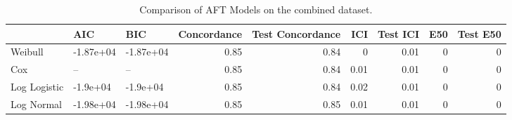 \begin{table*}
\centering
\caption{Comparison of AFT Models on the combined dataset.}
\label{tab:combined}
\begin{tabular}{lllrrrrrr}
\toprule
 & AIC & BIC & Concordance & Test Concordance & ICI & Test ICI & E50 & Test E50 \\
\midrule
Weibull & -1.87e+04 & -1.87e+04 & 0.85 & 0.84 & 0 & 0.01 & 0 & 0 \\
Cox & -- & -- & 0.85 & 0.84 & 0.01 & 0.01 & 0 & 0 \\
Log Logistic & -1.9e+04 & -1.9e+04 & 0.85 & 0.84 & 0.02 & 0.01 & 0 & 0 \\
Log Normal & -1.98e+04 & -1.98e+04 & 0.85 & 0.85 & 0.01 & 0.01 & 0 & 0 \\
\bottomrule
\end{tabular}
\end{table*}
